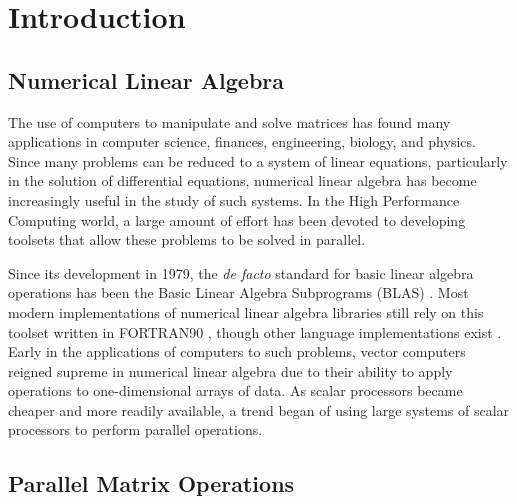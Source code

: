 \documentclass{dependencies/acm_proc_article-sp}
\begin{document}
%

%

\section{Introduction}
\subsection{Numerical Linear Algebra}

The use of computers to manipulate and solve matrices has found many applications in computer science, finances, engineering, biology, and physics. Since many problems can be reduced to a system of linear equations, particularly in the solution of differential equations, numerical linear algebra has become increasingly useful in the study of such systems. In the High Performance Computing world, a large amount of effort has been devoted to developing toolsets that allow these problems to be solved in parallel.

Since its development in 1979, the {\em de facto} standard for basic linear algebra operations has been the Basic Linear Algebra Subprograms (BLAS) \cite{BLAS}. Most modern implementations of numerical linear algebra libraries still rely on this toolset written in FORTRAN90 \cite{LAPACK}, though other language implementations exist \cite{CLAPACK,JBLAS}. Early in the applications of computers to such problems, vector computers reigned supreme in numerical linear algebra due to their ability to apply operations to one-dimensional arrays of data. As scalar processors became cheaper and more readily available, a trend began of using large systems of scalar processors to perform parallel operations.

\subsection{Parallel Matrix Operations}
\end{document}
